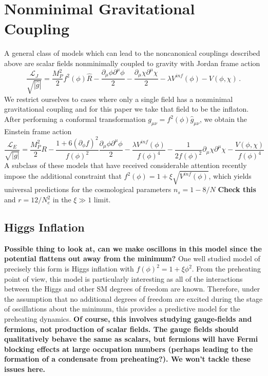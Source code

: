\documentclass[a4paper,11pt]{article}
\begin{document}
\section{Nonminimal Gravitational Coupling}
A general class of models which can lead to the noncanonical couplings described above are scalar fields nonminimally coupled to gravity with Jordan frame action
\begin{equation}
  \frac{\mathcal{L}_J}{\sqrt{|\hat{g}|}} = \frac{M_P^2}{2}f^2(\phi)\hat{R} - \frac{\partial_\mu\phi\partial^\mu\phi}{2} - \frac{\partial_\mu\chi\partial^\mu\chi}{2} - \lambda V^{inf}(\phi) - V(\phi,\chi) \, .
\end{equation}
We restrict ourselves to cases where only a single field has a nonminimal gravitational coupling and for this paper we take that field to be the inflaton.
After performing a conformal transformation $g_{\mu\nu} = f^2(\phi)\hat{g}_{\mu\nu}$, we obtain the Einstein frame action
\begin{equation}
  \frac{\mathcal{L}_E}{\sqrt{|g|}} = \frac{M_P^2}{2}R -\frac{1+6(\partial_\phi f)^2}{f(\phi)^2} \frac{\partial_\mu\phi\partial^\mu\phi}{2} - \frac{\lambda V^{inf}(\phi)}{f(\phi)^4} - \frac{1}{2f(\phi)^2}\partial_\mu\chi\partial^\mu\chi - \frac{V(\phi,\chi)}{f(\phi)^4}
\end{equation}
A subclass of these models that have received considerable attention recently impose the additional constraint that $f^2(\phi) = 1 + \xi\sqrt{V^{inf}(\phi)}$,
which yields universal predictions for the cosmological parameters $n_s=1-8/N$ {\bf Check this} and $r=12/N_e^2$ in the $\xi \gg 1$ limit.

\subsection{Higgs Inflation}
{\bf Possible thing to look at, can we make oscillons in this model since the potential flattens out away from the minimum?}
One well studied model of precisely this form is Higgs inflation with $f(\phi)^2 = 1+\xi\phi^2$.
From the preheating point of view, this model is particularly interesting as all of the interactions between the Higgs and other SM degrees of freedom are known.
Therefore, under the assumption that no additional degrees of freedom are excited during the stage of oscillations about the minimum, this provides a predictive model for the preheating dynamics.
{\bf Of course, this involves studying gauge-fields and fermions, not production of scalar fields.  The gauge fields should qualitatively behave the same as scalars, but fermions will have Fermi blocking effects at large occupation numbers (perhaps leading to the formation of a condensate from preheating?).  We won't tackle these issues here.}
\end{document}
